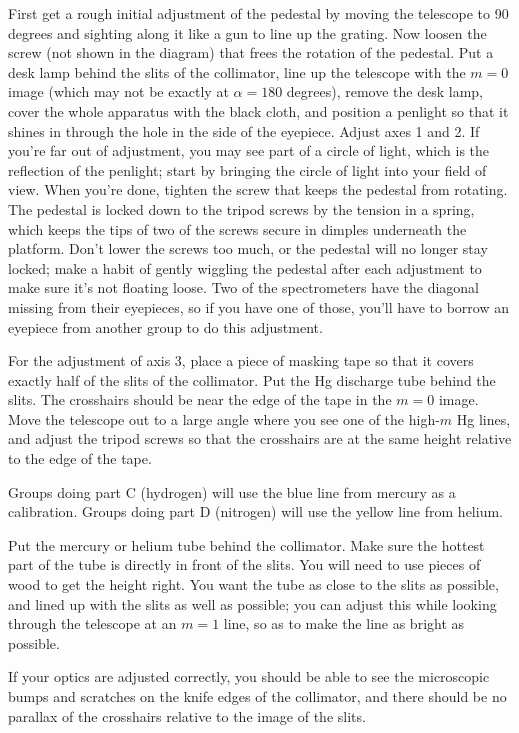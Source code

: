 First get a rough initial adjustment of the pedestal by moving the telescope to 90 degrees
and sighting along it like a gun to line up the grating.
Now loosen the screw (not shown in the diagram) that frees the rotation of the pedestal.
Put a desk lamp behind the slits of the collimator, line up the telescope with
the $m=0$ image (which may not be exactly at $\alpha=180$ degrees), remove the desk
lamp, cover the whole apparatus with the black cloth, and position a penlight
so that it shines in through the hole in the side of the eyepiece. Adjust axes
1 and 2. If you're far out of adjustment, you may see part of a circle of light,
which is the reflection of the penlight; start by bringing the circle of light
into your field of view. When you're done, tighten the screw that keeps the pedestal
from rotating. The pedestal is locked down to the tripod screws by the tension in
a spring, which keeps the tips of two of the screws secure in dimples underneath the
platform. Don't lower the screws too much, or the pedestal will no longer
stay locked; make a habit of gently wiggling the pedestal after each adjustment
to make sure it's not floating loose. Two of the spectrometers have the diagonal
missing from their eyepieces, so if you have one of those, you'll have to borrow
an eyepiece from another group to do this adjustment.

For the adjustment of axis 3, place a piece of masking tape so that it covers exactly
half of the slits of the collimator. Put the Hg discharge tube behind the slits.
The crosshairs should be near the edge of the tape in the $m=0$ image. Move the telescope out to
a large angle where you see one of the high-$m$ Hg lines, and adjust the tripod screws
so that the crosshairs are at the same height relative to the edge of the tape.


Groups doing part C (hydrogen) will use the blue line from mercury as a calibration.
Groups doing part D (nitrogen) will use the yellow line from helium.

Put the mercury or helium tube behind the collimator. Make sure the
hottest part of the tube is directly in
front of the slits. You will need to use pieces of wood to get the height right.
You want the tube as close to the slits as possible, and
lined up with the slits as well as possible; you can adjust
this while looking through the telescope at an $m=1$ line,
so as to make the line as bright as possible.

If your optics are adjusted correctly,
you should be able to see the microscopic
bumps and scratches on the knife edges of the collimator,
and there should be no parallax of the crosshairs relative
to the image of the slits.

